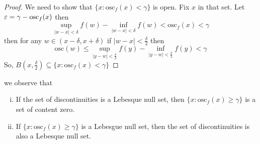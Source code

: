 \begin{proof}
  We need to show that $\{x : \mathrm{osc}_f(x) < \gamma\}$ is open. Fix $x$ in that set.
  Let $\varepsilon = {\gamma - \mathrm{osc}_f(x)}$ then 
  \[\sup_{|w-x|< \delta} f(w) - \inf_{|w-x| < \delta} f(w) < \mathrm{osc}_f(x) <\gamma \]
  then for any $w \in (x - \delta, x + \delta)$ if $|w - x| < \frac\delta2$ then
  \[\mathrm{osc}(w) \leq \sup_{|y - w|<\frac\delta2} f(y) - \inf_{|y-w| < \frac\delta2} f(y) < \gamma\]
  So, $B\left(x, \frac\delta2\right) \subseteq \{x : \mathrm{osc}_f(x) < \gamma\}$
\end{proof}
we observe that 
  \begin{enumerate}[(i)]
    \item If the set of discontinuities is a Lebesque null set, then 
    $\{x : \mathrm{osc}_f(x) \ge \gamma\}$ is a set of content zero. 
    \item If $\{x : \mathrm{osc}_f(x) \ge \gamma\}$ is a Lebesgue null set, then
    the set of discontinuities is also a Lebesque null set.
  \end{enumerate}

